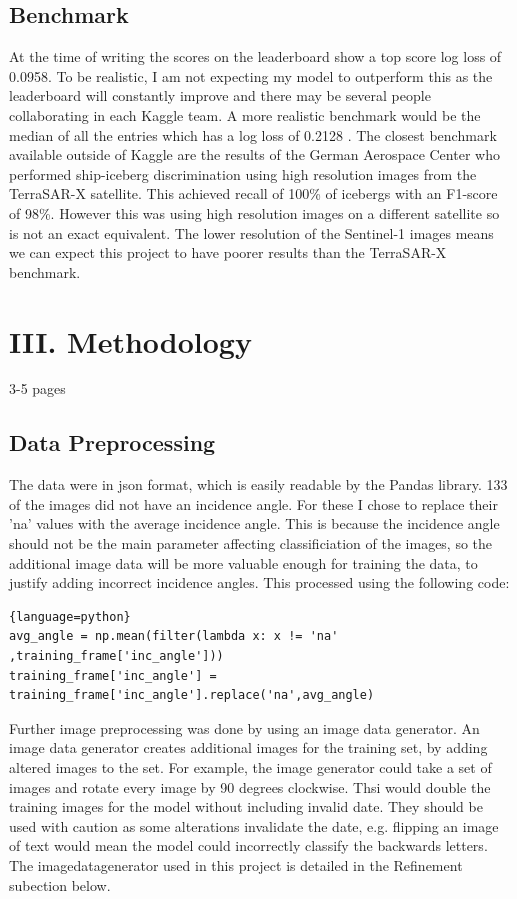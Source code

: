 \documentclass{article}
\begin{document}
\subsection{Benchmark}
At the time of writing the scores on the leaderboard show a top score log loss of 0.0958. To be realistic, I am not expecting my model to outperform this as the leaderboard will constantly improve and there may be several people collaborating in each Kaggle team. A more realistic benchmark would be the median of all the entries which has a log loss of 0.2128 \cite{kaggle}.
The closest benchmark available outside of Kaggle are the results of the German Aerospace Center \cite{bentes} who performed ship-iceberg discrimination using high resolution images from the TerraSAR-X satellite. This achieved recall of 100\% of icebergs with an F1-score of 98\%. However this was using high resolution images on a different satellite so is not an exact equivalent. The lower resolution of the Sentinel-1 images means we can expect this project to have poorer results than the TerraSAR-X benchmark. 

\section{III. Methodology}
3-5 pages
\subsection{Data Preprocessing}
The data were in json format, which is easily readable by the Pandas library. 133 of the images did not have an incidence angle. For these I chose to replace their 'na' values with the average incidence angle. This is because the incidence angle should not be the main parameter affecting classificiation of the images, so the additional image data will be more valuable enough for training the data, to justify adding incorrect incidence angles. This processed using the following code:
\begin{lstlisting}{language=python}
avg_angle = np.mean(filter(lambda x: x != 'na' ,training_frame['inc_angle']))
training_frame['inc_angle'] = training_frame['inc_angle'].replace('na',avg_angle)
\end{lstlisting}

Further image preprocessing was done by using an image data generator. An image data generator creates additional images for the training set, by adding altered images to the set. For example, the image generator could take a set of images and rotate every image by 90 degrees clockwise. Thsi would double the training images for the model without including invalid date. They should be used with caution as some alterations invalidate the date, e.g. flipping an image of text would mean the model could incorrectly classify the backwards letters. The imagedatagenerator used in this project is detailed in the Refinement subection below.
\end{document}
